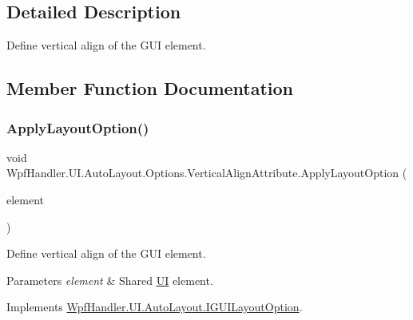 \subsection{Detailed Description}
Define vertical align of the G\+UI element. 



\subsection{Member Function Documentation}
\mbox{\label{class_wpf_handler_1_1_u_i_1_1_auto_layout_1_1_options_1_1_vertical_align_attribute_a5a37e0bcf32b49da94e4f4d539fe810c}} 
\subsubsection{\texorpdfstring{Apply\+Layout\+Option()}{ApplyLayoutOption()}}
{\footnotesize\ttfamily void Wpf\+Handler.\+U\+I.\+Auto\+Layout.\+Options.\+Vertical\+Align\+Attribute.\+Apply\+Layout\+Option (\begin{DoxyParamCaption}\item[{Framework\+Element}]{element }\end{DoxyParamCaption})}



Define vertical align of the G\+UI element. 


\begin{DoxyParams}{Parameters}
{\em element} & Shared \mbox{\hyperlink{namespace_wpf_handler_1_1_u_i}{UI}} element.\\
\hline
\end{DoxyParams}


Implements \mbox{\hyperlink{interface_wpf_handler_1_1_u_i_1_1_auto_layout_1_1_i_g_u_i_layout_option_ac2d2fa8aeaf753b3248381399f991005}{Wpf\+Handler.\+U\+I.\+Auto\+Layout.\+I\+G\+U\+I\+Layout\+Option}}.



